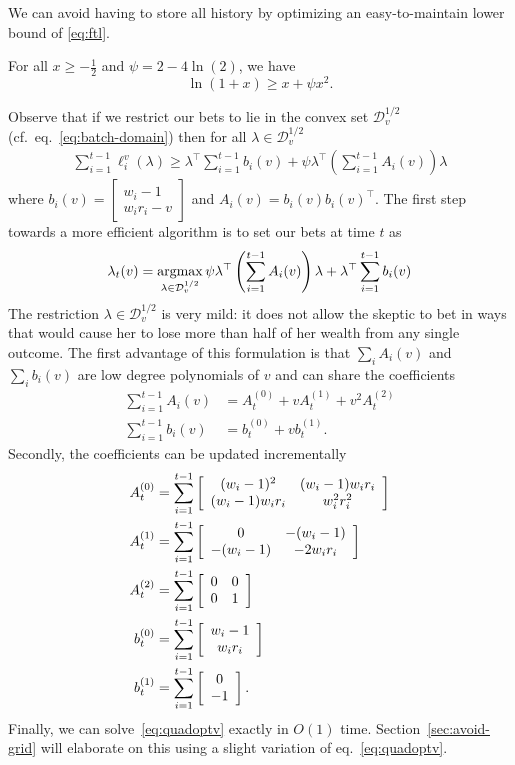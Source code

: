 We can avoid having to store all history by optimizing an easy-to-maintain
lower bound of \eqref{eq:ftl}.  
\begin{lemma} 
\label{lem:quadbound}
For all $x\geq -\frac{1}{2}$ and $\psi=2-4\ln(2)$, we have
\[
\ln(1+x)\geq x + \psi x^2.
\]
\end{lemma}
Observe that if we restrict our bets to lie in the convex set
$\mathcal{D}_v^{1/2}$ (cf.~eq.~\eqref{eq:batch-domain}) then for all $\lambda
\in \mathcal{D}_v^{1/2}$
\begin{align*}
\sum_{i=1}^{t-1} \ell_i^v(\lambda) 
\geq
\lambda^\top \sum_{i=1}^{t-1} b_i(v) 
+\psi \lambda^\top \left(\sum_{i=1}^{t-1} A_i(v)\right) \lambda
\end{align*}
where 
$b_i(v)=
\left[\begin{array}{c} 
w_i-1 \\ w_i r_i -v 
\end{array}\right] 
$
and 
$
A_i(v) = b_i(v)b_i(v)^\top.
$
The first step towards a more efficient algorithm is to set our bets at time
$t$ as
\begin{equation}
\lambda_t(v) = \operatorname*{argmax}_{\lambda \in \mathcal{D}_{v}^{1/2}}
\psi  \lambda^\top \left(\sum_{i=1}^{t-1} A_i(v)\right) \lambda 
+ \lambda^\top \sum_{i=1}^{t-1} b_i(v)
\label{eq:quadoptv}
\end{equation}
The restriction $\lambda \in \mathcal{D}_{v}^{1/2}$ is very mild: it does not
allow the skeptic to bet in ways that would cause her to lose more than half of
her wealth from any single outcome.  The first advantage of this formulation is
that $\sum_i A_i(v)$ and $\sum_i b_i(v)$ are low degree polynomials of $v$ and
can share the coefficients
    \begin{align*}
        \sum_{i=1}^{t-1} A_i(v) &= 
        A_t^{(0)} + v A_t^{(1)} + v^2 A_t^{(2)}\\   
        \sum_{i=1}^{t-1} b_i(v) &= b_t^{(0)} + v b_t^{(1)}.  
    \end{align*}
Secondly, the coefficients can be updated incrementally
    \begin{align}
        A_t^{(0)} &=\sum_{i=1}^{t-1}\left[\begin{array}{cc} (w_i-1)^2 & (w_i-1)w_i r_i \\ (w_i-1)w_i r_i & w_i^2r_i^2 \end{array}\right] \label{eq:upsuffa0}\\
        A_t^{(1)} &= \sum_{i=1}^{t-1} \left[\begin{array}{cc} 0 & -(w_i-1) \\ -(w_i-1) & -2w_ir_i \end{array}\right]\\
        A_t^{(2)} &=\sum_{i=1}^{t-1}  \left[\begin{array}{cc} 0 & 0 \\ 0 & 1 \end{array}\right]\\
        b_t^{(0)} &=\sum_{i=1}^{t-1}  \left[\begin{array}{c} w_i-1 \\ w_ir_i \end{array}\right]\\
        b_t^{(1)} &=\sum_{i=1}^{t-1}  \left[\begin{array}{c} 0 \\ -1 \end{array}\right]. \label{eq:upsuffb1}
    \end{align}
Finally, we can solve~\eqref{eq:quadoptv} exactly in $O(1)$ time.
Section~\ref{sec:avoid-grid} will elaborate on this using a slight variation of
eq.~\eqref{eq:quadoptv}.

